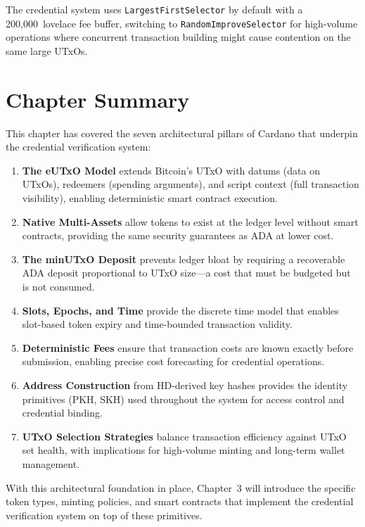 The credential system uses \texttt{LargestFirstSelector} by default
with a 200,000~lovelace fee buffer, switching to
\texttt{RandomImproveSelector} for high-volume operations where
concurrent transaction building might cause contention on the same
large UTxOs.


\section{Chapter Summary}
\label{sec:ch2-summary}

This chapter has covered the seven architectural pillars of Cardano that
underpin the credential verification system:

\begin{enumerate}[nosep]
  \item \textbf{The eUTxO Model} extends Bitcoin's UTxO with datums
    (data on UTxOs), redeemers (spending arguments), and script context
    (full transaction visibility), enabling deterministic smart contract
    execution.
  \item \textbf{Native Multi-Assets} allow tokens to exist at the
    ledger level without smart contracts, providing the same security
    guarantees as ADA at lower cost.
  \item \textbf{The minUTxO Deposit} prevents ledger bloat by requiring
    a recoverable ADA deposit proportional to UTxO size---a cost that
    must be budgeted but is not consumed.
  \item \textbf{Slots, Epochs, and Time} provide the discrete time
    model that enables slot-based token expiry and time-bounded
    transaction validity.
  \item \textbf{Deterministic Fees} ensure that transaction costs are
    known exactly before submission, enabling precise cost forecasting
    for credential operations.
  \item \textbf{Address Construction} from HD-derived key hashes
    provides the identity primitives (PKH, SKH) used throughout the
    system for access control and credential binding.
  \item \textbf{UTxO Selection Strategies} balance transaction
    efficiency against UTxO set health, with implications for
    high-volume minting and long-term wallet management.
\end{enumerate}

With this architectural foundation in place, Chapter~3 will introduce
the specific token types, minting policies, and smart contracts that
implement the credential verification system on top of these primitives.
